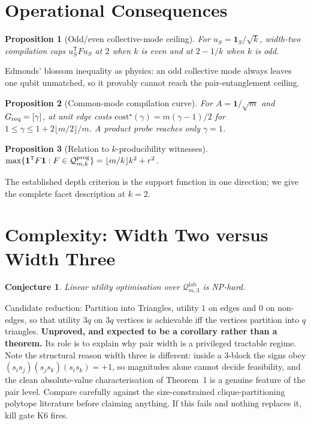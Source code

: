 \documentclass[11pt]{article}
\newtheorem{proposition}{Proposition}
\newtheorem{conjecture}{Conjecture}
\begin{document}
\section{Operational Consequences}
\begin{proposition}[Odd/even collective-mode ceiling]
For $u_S=\bm1_S/\sqrt k$, width-two compilation caps $u_S^{\mathsf T}Fu_S$ at $2$ when $k$ is
even and at $2-1/k$ when $k$ is odd.
\end{proposition}
Edmonds' blossom inequality as physics: an odd collective mode always leaves one qubit
unmatched, so it provably cannot reach the pair-entanglement ceiling.
\begin{proposition}[Common-mode compilation curve]
For $A=\bm1/\sqrt m$ and $G_{\rm req}=[\gamma]$, at unit edge costs
$\mathrm{cost}^\star(\gamma)=m(\gamma-1)/2$ for $1\le\gamma\le1+2\lfloor m/2\rfloor/m$. A
product probe reaches only $\gamma=1$.
\end{proposition}
\begin{proposition}[Relation to $k$-producibility witnesses]
$\max\{\bm1^{\mathsf T}F\bm1:F\in\mathcal Q^{\rm prog}_{m,k}\}=\lfloor m/k\rfloor k^2+r^2$.
\end{proposition}
The established depth criterion is the support function in one direction; we give the complete
facet description at $k=2$.

\section{Complexity: Width Two versus Width Three}
\begin{conjecture}
Linear utility optimisation over $\mathcal Q^{\mathrm{lab}}_{m,3}$ is NP-hard.
\end{conjecture}
Candidate reduction: Partition into Triangles, utility $1$ on edges and $0$ on non-edges, so
that utility $3q$ on $3q$ vertices is achievable iff the vertices partition into $q$
triangles. \textbf{Unproved, and expected to be a corollary rather than a theorem.} Its role is
to explain why pair width is a privileged tractable regime. Note the structural reason width
three is different: inside a $3$-block the signs obey
$(s_is_j)(s_js_k)(s_is_k)=+1$, so magnitudes alone cannot decide feasibility, and the clean
absolute-value characterisation of Theorem~1 is a genuine feature of the pair level. Compare carefully against the size-constrained
clique-partitioning polytope literature before claiming anything. If this fails and nothing
replaces it, kill gate K6 fires.
\end{document}

